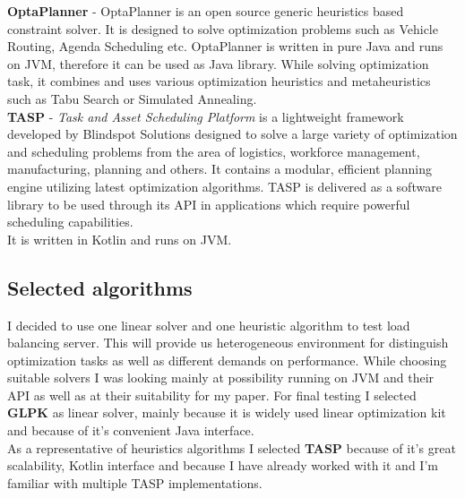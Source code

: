 \textbf{OptaPlanner} - OptaPlanner is an open source generic heuristics based constraint solver.
It is designed to solve optimization problems such as Vehicle Routing, Agenda Scheduling etc.
OptaPlanner is written in pure Java and runs on JVM, therefore it can be used as Java library.
While solving optimization task, it combines and uses various optimization heuristics and metaheuristics such as
Tabu Search or Simulated Annealing.\\

\textbf{TASP} - \textit{Task and Asset Scheduling Platform}  is a lightweight framework developed by Blindspot Solutions designed to solve a large
variety of optimization and scheduling problems from the area of logistics, workforce management, manufacturing, planning and others.
It contains a modular, efficient planning engine utilizing latest optimization algorithms.
TASP is delivered as a software library to be used through its API in applications which require powerful scheduling capabilities.\\
It is written in Kotlin and runs on JVM\@.

\subsection{Selected algorithms}\label{subsec:selected-algorithms}
I decided to use one linear solver and one heuristic algorithm to test load balancing server.
This will provide us heterogeneous environment for distinguish optimization tasks as well as different demands on performance.
While choosing suitable solvers I was looking mainly at possibility running on JVM and their API as well as at their suitability for my paper.
For final testing I selected \textbf{GLPK} as linear solver, mainly because it is widely used linear optimization kit
and because of it's convenient Java interface.\\
As a representative of heuristics algorithms I selected \textbf{TASP} because of it's great scalability, Kotlin interface
and because I have already worked with it and I'm familiar with multiple TASP implementations.

